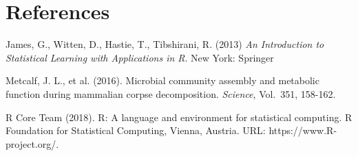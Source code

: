 \documentclass{article}
\begin{document}
\section{References}

\noindent James, G., Witten, D., Hastie, T., Tibshirani, R. (2013) \textit{An
  Introduction to Statistical Learning with Applications in R}. New
York: Springer

\noindent Metcalf, J. L., et al. (2016).  Microbial community assembly and
metabolic function during mammalian corpse decomposition.
\textit{Science}, Vol.~351, 158-162.

\noindent R Core Team (2018). R: A language and environment for
statistical computing. R Foundation for Statistical Computing, Vienna,
Austria. URL: https://www.R-project.org/.
\end{document}
